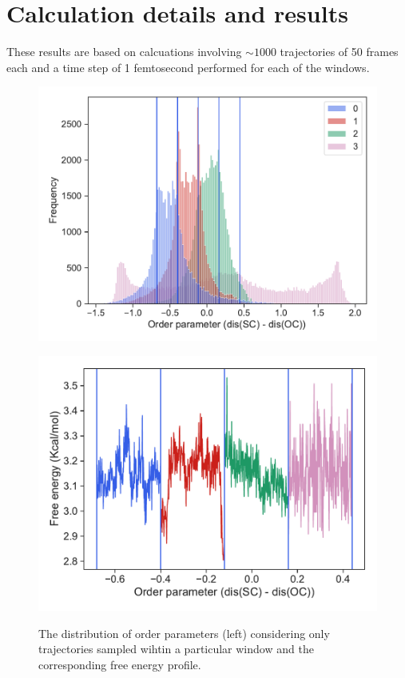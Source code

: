 \documentclass{article}
\begin{document}
\section*{Calculation details and results}
These results are based on calcuations involving $\sim 1000$ trajectories of 50 frames each and a time step of 1 femtosecond performed for each of the windows. 
\begin{figure}[ht]
  \centering
  \begin{minipage}[b]{0.45\linewidth}
    \includegraphics[scale=0.53]{figures/dist.pdf}
    \label{fig:dist}
  \end{minipage}
  \quad
  \begin{minipage}[b]{0.45\linewidth}
    \includegraphics[scale=0.53]{figures/fenergy.pdf}
    \label{fig:fenergy}
  \end{minipage}
  \caption{The distribution of order parameters (left) considering only trajectories sampled wihtin a particular window and the corresponding free energy profile.}
\end{figure}
\end{document}
